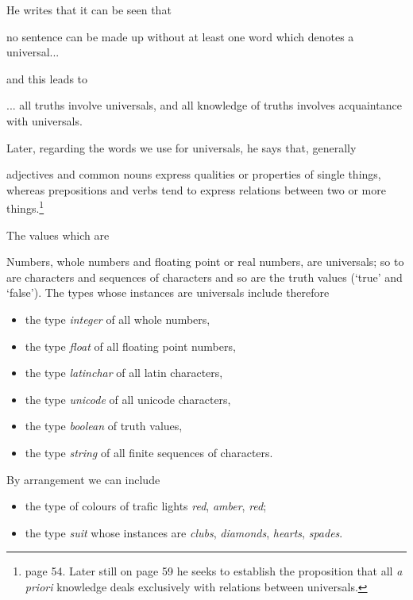 He writes that it can be seen that
\begin{erquote}
 no sentence can be made up without at least one word which denotes a universal...
\end{erquote}
and this  leads to 
\begin{erquote}
... all truths involve universals, and all knowledge of truths involves acquaintance with universals.
\end{erquote}
Later, regarding the words we use for universals, he says that, generally
\begin{erquote}
adjectives and common nouns express qualities or properties of single things, whereas prepositions and verbs tend to express relations between two or more things.\footnote{page 54. Later still on page 59 he seeks to establish the proposition that
all \textit{a priori} knowledge deals exclusively with relations between universals.
}
\end{erquote}


The values which are 

\mynote 
Numbers, whole numbers and floating point or real numbers, are universals;
 so to are characters and sequences of characters and so are the truth values (`true' and `false'). 
The types whose instances are universals include therefore
\begin{itemize}
	\item the type \textit{integer} of all whole numbers,
	\item the type \textit{float} of all floating point numbers,
	\item the type \textit{latinchar} of all latin characters,
	\item the type \textit{unicode} of all unicode characters,
	\item the type \textit{boolean} of truth values,
	\item the type \textit{string} of all finite sequences of characters.
\end{itemize}

\mynote By arrangement we can include
\begin{itemize}
	\item the type of colours of trafic lights \textit{red}, \textit{amber}, \textit{red};
	\item the type \textit{suit} whose instances are \textit{clubs}, \textit{diamonds}, \textit{hearts}, \textit{spades}.
\end{itemize}

